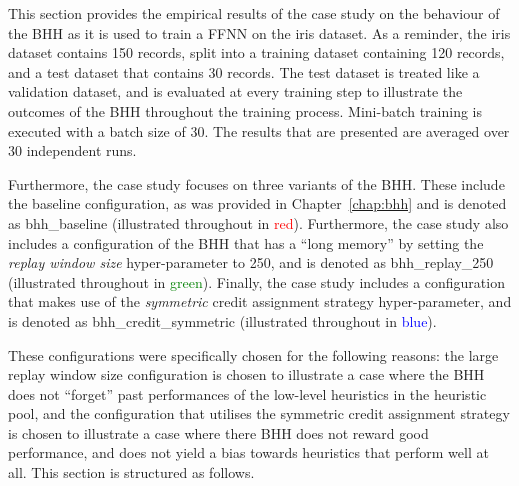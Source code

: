 This section provides the empirical results of the case study on the behaviour of the \acs{BHH} as it is used to train a \acs{FFNN} on the iris dataset. As a reminder, the iris dataset contains 150 records, split into a training dataset containing 120 records, and a test dataset that contains 30 records. The test dataset is treated like a validation dataset, and is evaluated at every training step to illustrate the outcomes of the \acs{BHH} throughout the training process. Mini-batch training is executed with a batch size of 30. The results that are presented are averaged over 30 independent runs.

Furthermore, the case study focuses on three variants of the \acs{BHH}. These include the baseline configuration, as was provided in Chapter~\ref{chap:bhh} and is denoted as bhh\_baseline (illustrated throughout in \textcolor{red}{red}). Furthermore, the case study also includes a configuration of the \acs{BHH} that has a ``long memory'' by setting the \textit{replay window size} hyper-parameter to 250, and is denoted as bhh\_replay\_250 (illustrated throughout in \textcolor{green}{green}). Finally, the case study includes a configuration that makes use of the \textit{symmetric} credit assignment strategy hyper-parameter, and is denoted as bhh\_credit\_symmetric (illustrated throughout in \textcolor{blue}{blue}).

These configurations were specifically chosen for the following reasons: the large replay window size configuration is chosen to illustrate a case where the \acs{BHH} does not ``forget'' past performances of the low-level heuristics in the heuristic pool, and the configuration that utilises the symmetric credit assignment strategy is chosen to illustrate a case where there \acs{BHH} does not reward good performance, and does not yield a bias towards heuristics that perform well at all. This section is structured as follows.


